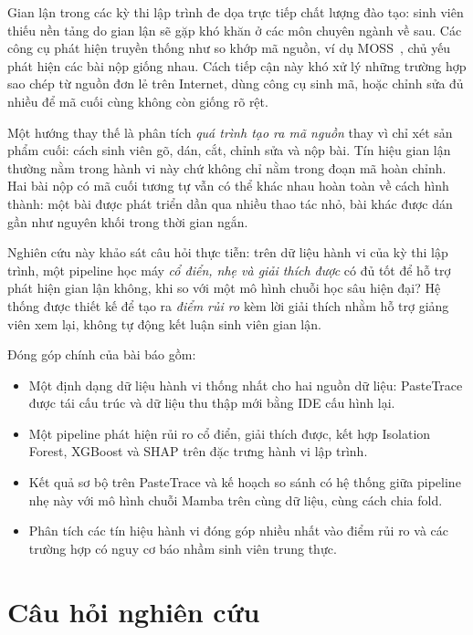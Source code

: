 \documentclass[runningheads]{llncs}
\begin{document}
Gian lận trong các kỳ thi lập trình đe dọa trực tiếp chất lượng đào tạo:
sinh viên thiếu nền tảng do gian lận sẽ gặp khó khăn ở các môn chuyên ngành
về sau. Các công cụ phát hiện truyền thống như so khớp mã nguồn, ví dụ
MOSS~\cite{moss}, chủ yếu phát hiện các bài nộp giống nhau. Cách tiếp cận này
khó xử lý những trường hợp sao chép từ nguồn đơn lẻ trên Internet, dùng công cụ
sinh mã, hoặc chỉnh sửa đủ nhiều để mã cuối cùng không còn giống rõ rệt.

Một hướng thay thế là phân tích \emph{quá trình tạo ra mã nguồn} thay vì chỉ
xét sản phẩm cuối: cách sinh viên gõ, dán, cắt, chỉnh sửa và nộp bài. Tín hiệu
gian lận thường nằm trong hành vi này chứ không chỉ nằm trong đoạn mã hoàn
chỉnh. Hai bài nộp có mã cuối tương tự vẫn có thể khác nhau hoàn toàn về cách
hình thành: một bài được phát triển dần qua nhiều thao tác nhỏ, bài khác được
dán gần như nguyên khối trong thời gian ngắn.

Nghiên cứu này khảo sát câu hỏi thực tiễn: trên dữ liệu hành vi của kỳ thi lập
trình, một pipeline học máy \emph{cổ điển, nhẹ và giải thích được} có đủ tốt để
hỗ trợ phát hiện gian lận không, khi so với một mô hình chuỗi học sâu hiện đại?
Hệ thống được thiết kế để tạo ra \emph{điểm rủi ro} kèm lời giải thích nhằm hỗ
trợ giảng viên xem lại, không tự động kết luận sinh viên gian lận.

Đóng góp chính của bài báo gồm:
\begin{itemize}
\item Một định dạng dữ liệu hành vi thống nhất cho hai nguồn dữ liệu: PasteTrace
được tái cấu trúc và dữ liệu thu thập mới bằng IDE cấu hình lại.
\item Một pipeline phát hiện rủi ro cổ điển, giải thích được, kết hợp
Isolation Forest, XGBoost và SHAP trên đặc trưng hành vi lập trình.
\item Kết quả sơ bộ trên PasteTrace và kế hoạch so sánh có hệ thống giữa
pipeline nhẹ này với mô hình chuỗi Mamba trên cùng dữ liệu, cùng cách chia fold.
\item Phân tích các tín hiệu hành vi đóng góp nhiều nhất vào điểm rủi ro và
các trường hợp có nguy cơ báo nhầm sinh viên trung thực.
\end{itemize}

\section{Câu hỏi nghiên cứu}
\label{sec:rq}
\end{document}
